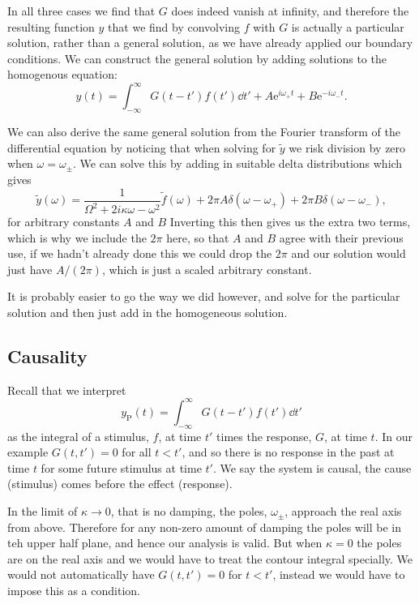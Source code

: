 \documentclass[fleqn]{NotesClass}
\newcommand*{\e}{\mathrm{e}}
\begin{document}
    In all three cases we find that \(G\) does indeed vanish at infinity, and therefore the resulting function \(y\) that we find by convolving \(f\) with \(G\) is actually a particular solution, rather than a general solution, as we have already applied our boundary conditions.
    We can construct the general solution by adding solutions to the homogenous equation:
    \begin{equation}
        y(t) = \int_{-\infty}^{\infty} G(t - t')f(t') \dd{t'} + A\e^{i\omega_{+}t} + B\e^{-i\omega_{-}t}.
    \end{equation}
    
    We can also derive the same general solution from the Fourier transform of the differential equation by noticing that when solving for \(\tilde{y}\) we risk division by zero when \(\omega = \omega_{\pm}\).
    We can solve this by adding in suitable delta distributions which gives
    \begin{equation}
        \tilde{y}(\omega) = \frac{1}{\Omega^2 + 2i\kappa\omega - \omega^2}\tilde{f}(\omega) + 2\pi A\delta(\omega - \omega_{+}) + 2\pi B \delta(\omega - \omega_{-}),
    \end{equation}
    for arbitrary constants \(A\) and \(B\)
    Inverting this then gives us the extra two terms, which is why we include the \(2\pi\) here, so that \(A\) and \(B\) agree with their previous use, if we hadn't already done this we could drop the \(2\pi\) and our solution would just have \(A/(2\pi)\), which is just a scaled arbitrary constant.
    
    It is probably easier to go the way we did however, and solve for the particular solution and then just add in the homogeneous solution.
    
    \subsection{Causality}
    Recall that we interpret
    \begin{equation}
        y_{\mathrm{P}}(t) = \int_{-\infty}^{\infty} G(t - t')f(t') \dd{t'}
    \end{equation}
    as the integral of a stimulus, \(f\), at time \(t'\) times the response, \(G\), at time \(t\).
    In our example \(G(t, t') = 0\) for all \(t < t'\), and so there is no response in the past at time \(t\) for some future stimulus at time \(t'\).
    We say the system is causal, the cause (stimulus) comes before the effect (response).
    
    In the limit of \(\kappa \to 0\), that is no damping, the poles, \(\omega_{\pm}\), approach the real axis from above.
    Therefore for any non-zero amount of damping the poles will be in teh upper half plane, and hence our analysis is valid.
    But when \(\kappa = 0\) the poles are on the real axis and we would have to treat the contour integral specially.
    We would not automatically have \(G(t, t') = 0\) for \(t < t'\), instead we would have to impose this as a condition.
    
\end{document}
